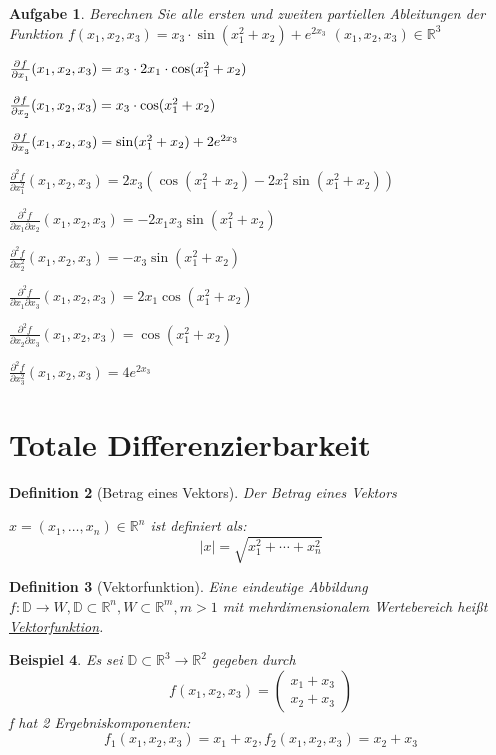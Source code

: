 \documentclass[fontset=ubuntu,12pt,a4paper]{scrreprt}
\newtheorem{defi}{Definition}[section]
\newtheorem{beispiel}[defi]{Beispiel}
\newtheorem{aufg}[defi]{Aufgabe}
\begin{document}
\begin{aufg}
    Berechnen Sie alle ersten und zweiten partiellen Ableitungen der Funktion \(f(x_1,x_2,x_3)=x_3 \cdot \sin(x_1^2+x_2)+e^{2x_3}\) \((x_1,x_2,x_3)\in\mathbb{R}^3\)

    \(\pd{f}{x_1}(x_1,x_2,x_3) = x_3 \cdot 2x_1 \cdot \cos(x_1^2+x_2)\)

    \(\pd{f}{x_2}(x_1,x_2,x_3) = x_3 \cdot \cos(x_1^2+x_2)\)

    \(\pd{f}{x_3}(x_1,x_2,x_3) = \sin(x_1^2+x_2) + 2e^{2x_3}\)

    \(\frac{\partial^2 f}{\partial x_1^2}(x_1,x_2,x_3) = 2x_3 \left(\cos(x_1^2+x_2) - 2x_1^2\sin(x_1^2+x_2)\right)\)

    \(\frac{\partial^2 f}{\partial x_1 \partial x_2}(x_1,x_2,x_3) = -2x_1x_3 \sin(x_1^2+x_2)\)

    \(\frac{\partial^2 f}{\partial x_2^2}(x_1,x_2,x_3) = -x_3\sin(x_1^2+x_2)\)

    \(\frac{\partial^2 f}{\partial x_1 \partial x_3}(x_1,x_2,x_3) = 2x_1 \cos(x_1^2+x_2)\)

    \(\frac{\partial^2 f}{\partial x_2 \partial x_3}(x_1,x_2,x_3) = \cos(x_1^2+x_2)\)

    \(\frac{\partial^2 f}{\partial x_3^2}(x_1,x_2,x_3) = 4e^{2x_3}\)
\end{aufg}

\section{Totale Differenzierbarkeit}

\begin{defi}[Betrag eines Vektors]
    Der Betrag eines Vektors
    
    \(x=(x_1,\dots,x_n)\in\mathbb{R}^n\) ist definiert als:
    \[\vert x \vert = \sqrt{x_1^2+\cdots+x_n^2}\]
\end{defi}

\begin{defi}[Vektorfunktion]
    Eine eindeutige Abbildung \(f:\mathbb{D}\to W,\mathbb{D}\subset\mathbb{R}^n,W\subset\mathbb{R}^m,m>1\) mit mehrdimensionalem Wertebereich heißt \underline{Vektorfunktion}.
\end{defi}

\begin{beispiel}
    Es sei \(\mathbb{D}\subset\mathbb{R}^3\to\mathbb{R}^2\) gegeben durch
    \[f(x_1,x_2,x_3)=\begin{pmatrix}
    x_1+x_3 \\ x_2+x_3
    \end{pmatrix}\]
    f hat 2 Ergebniskomponenten:
    \[f_1(x_1,x_2,x_3)=x_1+x_2,f_2(x_1,x_2,x_3)=x_2+x_3\]
\end{beispiel}
\end{document}
